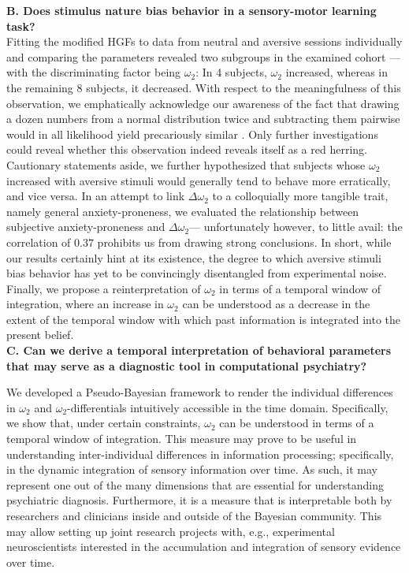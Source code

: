 \documentclass{article}
\begin{document}
\begin{multicols}{2}
\textbf{B. Does stimulus nature bias behavior in a sensory-motor learning task?}\\
Fitting the modified HGFs to data from neutral and aversive sessions individually and comparing the parameters revealed two subgroups in the examined cohort --- with the discriminating factor being $\omega_2$: In 4 subjects, $\omega_2$ increased, whereas in the remaining 8 subjects, it decreased. With respect to the meaningfulness of this observation, we emphatically acknowledge our awareness of the fact that drawing a dozen numbers from a normal distribution twice and subtracting them pairwise would in all likelihood yield precariously similar . Only further investigations could reveal whether this observation indeed reveals itself as a red herring.\\ 
Cautionary statements aside, we further hypothesized that subjects whose $\omega_2$ increased with aversive stimuli would generally tend to behave more erratically, and vice versa. In an attempt to link $\Delta\omega_2$ to a colloquially more tangible trait, namely general anxiety-proneness, we evaluated the relationship between subjective anxiety-proneness and $\Delta\omega_2$--- unfortunately however, to little avail: the correlation of $0.37$ prohibits us from drawing strong conclusions. In short, while our results certainly hint at its existence, the degree to which aversive stimuli bias behavior has yet to be convincingly disentangled from experimental noise. \\ 
Finally, we propose a reinterpretation of $\omega_2$ in terms of a temporal window of integration, where an increase in $\omega_2$ can be understood as a decrease in the extent of the temporal window with which past information is integrated into the present belief. \\

\textbf{C. Can we derive a temporal interpretation of behavioral parameters that may serve as a  diagnostic tool in computational psychiatry?}

We developed a Pseudo-Bayesian framework to render the individual differences in $\omega_2$ and $\omega_{2}$-differentials intuitively accessible in the time domain. Specifically, we show that, under certain constraints, $\omega_{2}$ can be understood in terms of a \textsf{temporal window of integration}. This measure may prove to be useful in understanding inter-individual differences in information processing; specifically, in the dynamic integration of sensory information over time. As such, it may represent one out of the many dimensions that are essential for understanding psychiatric diagnosis. Furthermore, it is a measure that is interpretable both by researchers and clinicians inside and outside of the Bayesian community. This may allow setting up joint research projects with, e.g., experimental neuroscientists interested in the accumulation and integration of sensory evidence over time.


\end{multicols}
\end{document}
